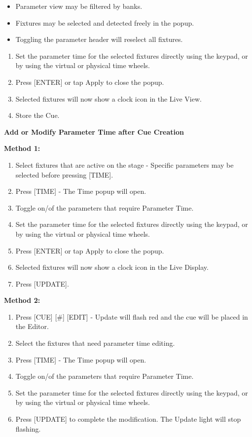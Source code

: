 \documentclass[
]{article}
\begin{document}
\begin{itemize}
\item
  Parameter view may be filtered by banks.
\item
  Fixtures may be selected and detected freely in the popup.
\item
  Toggling the parameter header will reselect all fixtures.
\end{itemize}

\begin{enumerate}
\def\labelenumi{\arabic{enumi}.}
\setcounter{enumi}{4}
\item
  Set the parameter time for the selected fixtures directly using the keypad, or by using the virtual or physical time wheels.
\item
  Press {[}ENTER{]} or tap Apply to close the popup.
\item
  Selected fixtures will now show a clock icon in the Live View.
\item
  Store the Cue.
\end{enumerate}

\textbf{Add or Modify Parameter Time after Cue Creation}

\textbf{Method 1:}

\begin{enumerate}
\def\labelenumi{\arabic{enumi}.}
\item
  Select fixtures that are active on the stage - Specific parameters may be selected before pressing {[}TIME{]}.
\item
  Press {[}TIME{]} - The Time popup will open.
\item
  Toggle on/of the parameters that require Parameter Time.
\item
  Set the parameter time for the selected fixtures directly using the keypad, or by using the virtual or physical time wheels.
\item
  Press {[}ENTER{]} or tap Apply to close the popup.
\item
  Selected fixtures will now show a clock icon in the Live Display.
\item
  Press {[}UPDATE{]}.
\end{enumerate}

\textbf{Method 2:}

\begin{enumerate}
\def\labelenumi{\arabic{enumi}.}
\item
  Press {[}CUE{]} {[}\#{]} {[}EDIT{]} - Update will flash red and the cue will be placed in the Editor.
\item
  Select the fixtures that need parameter time editing.
\item
  Press {[}TIME{]} - The Time popup will open.
\item
  Toggle on/of the parameters that require Parameter Time.
\item
  Set the parameter time for the selected fixtures directly using the keypad, or by using the virtual or physical time wheels.
\item
  Press {[}UPDATE{]} to complete the modification. The Update light will stop flashing.
\end{enumerate}
\end{document}
